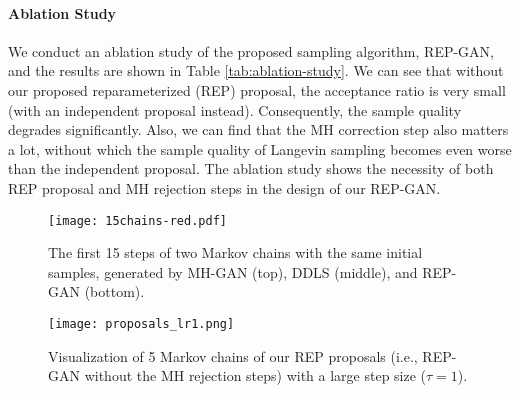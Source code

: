 \documentclass[runningheads]{llncs}
\newcommand{\<}{\left\langle}
\renewcommand{\>}{\right\rangle}
\begin{document}
\paragraph{\textbf{Ablation Study}} We conduct an ablation study of the proposed sampling algorithm, REP-GAN, and  the results are shown in Table \ref{tab:ablation-study}.  We can see that without our proposed reparameterized (REP) proposal, the acceptance ratio is very small (with an independent proposal instead). Consequently, the sample quality degrades significantly. Also, we can find that the MH correction step also matters a lot, without which the sample quality of Langevin sampling becomes even worse than the independent proposal. The ablation study shows the necessity of both REP proposal and MH rejection steps in the design of our REP-GAN.


\begin{figure}[t]\centering
\texttt{[image: 15chains-red.pdf]}
\caption{The first 15 steps of two Markov chains with the same initial samples, generated by 
MH-GAN (top), DDLS (middle), and REP-GAN (bottom).}
\label{fig:sampled-chain}
\end{figure}


\begin{figure}[h]
    \centering
    \texttt{[image: proposals\_lr1.png]}
    \caption{Visualization of 5 Markov chains of our REP proposals (i.e., REP-GAN without the MH rejection steps) with a large step size ($\tau=1$).}
    \label{fig:proposals}
\end{figure}
\end{document}
